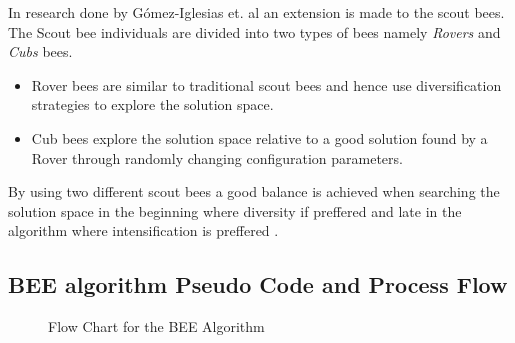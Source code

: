 In research done by G\'{o}mez-Iglesias et. al \cite{ABCFusionGrid} an extension is made to the scout bees. The Scout bee individuals are divided into two types of bees namely \emph{Rovers} and \emph{Cubs} bees\cite{ABCFusionGrid}.
\begin{itemize}
\item{Rover bees} are similar to traditional scout bees and hence use diversification strategies to explore the solution space. 
\item {Cub bees} explore the solution space relative to a good solution found by a Rover through randomly changing configuration parameters. 
\end{itemize}
By using two different scout bees a good balance is achieved when searching the solution space in the beginning where diversity if preffered and late in the algorithm where intensification is preffered \cite{ABCFusionGrid}.
\subsection{BEE algorithm Pseudo Code and Process Flow}
\begin{figure}[htbp!]
	\begin{center}
	\caption{Flow Chart for the BEE Algorithm}
	\label{fig:BeeAlgorithmFlowChart}
	\end{center}
\end{figure}

